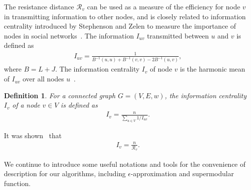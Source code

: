 \documentclass{article}
\newcommand{\eps}{\epsilon}
\newcommand\LL{\bm{\mathit{L}}}
\newcommand\BB{\boldsymbol{\mathit{B}}}
\newcommand\JJ{\boldsymbol{\mathit{J}}}
\newtheorem{definition}[theo]{Definition}
\begin{document}

The  resistance distance $\mathcal{R}_v$ can be used as a  measure of the efficiency for node $v$ in transmitting information to other nodes, and is closely related to information centrality introduced by Stephenson and Zelen to measure the importance of nodes in social networks~\cite{StZe89}. The information $I_{uv}$ transmitted between
$u$ and $v$ is defined as
\begin{align*}
I_{uv} = \frac{1}{\BB^{-1}(u,u) + \BB^{-1}(v,v) - 2\BB^{-1}(u,v)},
\end{align*}
where $\BB = \LL + \JJ$. The information centrality $I_v$  of node $v$ is the harmonic mean of  $I_{uv}$ over all nodes $u$~\cite{StZe89}.
\begin{definition}
For a connected graph $G = (V,E,w)$, the information centrality $I_v$ of a node $v\in V$ is defined as
\begin{align*}
I_v = \frac{n}{ \sum\limits_{u\in V} 1 / I_{uv}}.
\end{align*}
\end{definition}
It was shown~\cite{BrFl05} that
\begin{align}\label{ItoR}
I_v = \frac{n}{\mathcal{R}_v}.
\end{align}

We continue to introduce some useful notations and tools for the convenience of description for our algorithms, including $\eps$-approximation and supermodular function.
\end{document}

